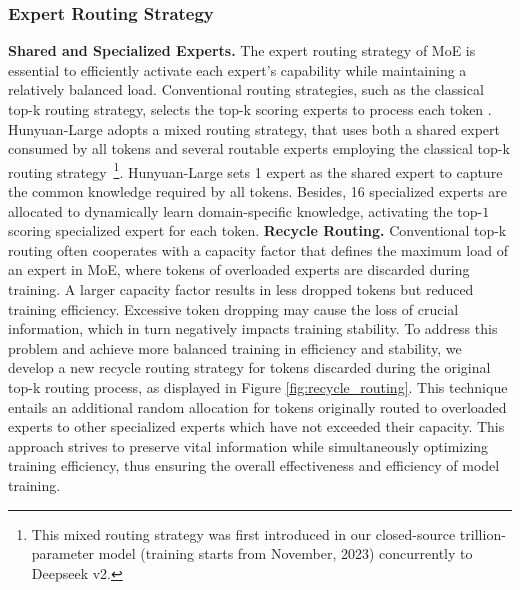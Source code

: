 \documentclass{article}
\begin{document}
\subsubsection{Expert Routing Strategy}
\noindent
\textbf{Shared and Specialized Experts.}
The expert routing strategy of MoE is essential to efficiently activate each expert's capability while maintaining a relatively balanced load. Conventional routing strategies, such as the classical top-k routing strategy, selects the top-k scoring experts to process each token \citep{jiang2024mixtral,qwen_moe}. Hunyuan-Large adopts a mixed routing strategy, that uses both a shared expert consumed by all tokens and several routable experts employing the classical top-k routing strategy~\footnote{This mixed routing strategy was first introduced in our closed-source trillion-parameter model (training starts from November, 2023) concurrently to Deepseek v2.}. 
Hunyuan-Large sets 1 expert as the shared expert to capture the common knowledge required by all tokens. Besides, 16 specialized experts are allocated to dynamically learn domain-specific knowledge, activating the top-$1$ scoring specialized expert for each token.
\noindent
\textbf{Recycle Routing.}
Conventional top-k routing often cooperates with a capacity factor that defines the maximum load of an expert in MoE, where tokens of overloaded experts are discarded during training. A larger capacity factor results in less dropped tokens but reduced training efficiency.
Excessive token dropping may cause the loss of crucial information, which in turn negatively impacts training stability. To address this problem and achieve more balanced training in efficiency and stability, we develop a new recycle routing strategy for tokens discarded during the original top-k routing process, as displayed in Figure \ref{fig:recycle_routing}. This technique entails an additional random allocation for tokens originally routed to overloaded experts to other specialized experts which have not exceeded their capacity. This approach strives to preserve vital information while simultaneously optimizing training efficiency, thus ensuring the overall effectiveness and efficiency of model training.
\end{document}
